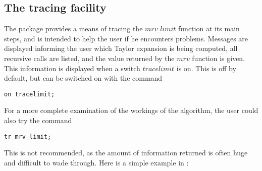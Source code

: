 \subsection{The tracing facility}
The package provides a means of tracing the $mrv\_limit$ function at its main steps, and is intended to help the user if he encounters problems. Messages are displayed informing the user which Taylor expansion is being computed, all recursive calls are listed, and the value returned by the $mrv$ function is given. This information is displayed when  a switch $tracelimit$ is on. This is off by default, but can be switched on with the command
\begin{verbatim}
on tracelimit;
\end{verbatim}
For a more complete examination of the workings of the algorithm, the user could also try the command
\begin{verbatim}
tr mrv_limit;
\end{verbatim}
This is not recommended, as the amount of information returned is often huge and difficult to wade through.
Here is a simple example in \REDUCE:

